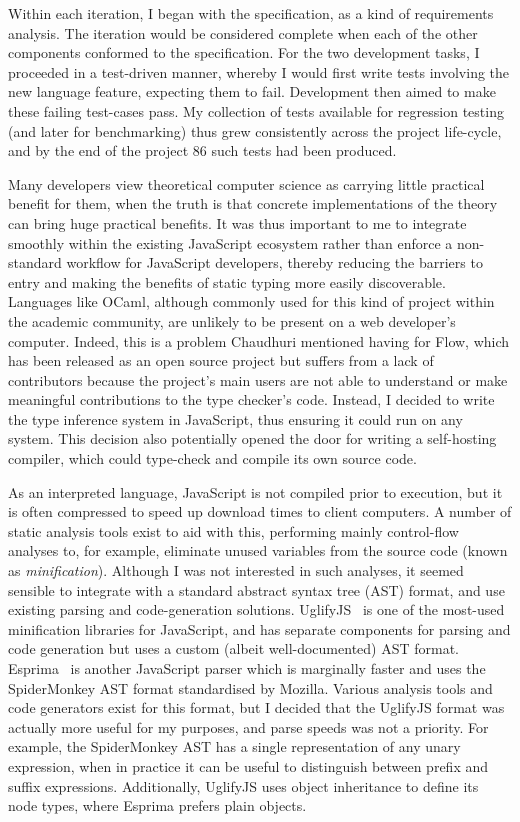 \documentclass[12pt,a4paper,twoside,openright]{report}
\begin{document}
Within each iteration, I began with the specification, as a kind of
requirements analysis. The iteration would be considered complete when each of
the other components conformed to the specification. For the two development
tasks, I proceeded in a test-driven manner, whereby I would first write tests
involving the new language feature, expecting them to fail. Development 
then aimed to make these failing test-cases pass. My collection of tests
available for regression testing (and later for benchmarking) thus grew
consistently across the project life-cycle, and by the end of the project 86
such tests had been produced.

Many developers view theoretical computer science as carrying little practical
benefit for them, when the truth is that concrete implementations of the theory
can bring huge practical benefits. It was thus important to me to integrate
smoothly within the existing JavaScript ecosystem rather than enforce a
non-standard workflow for JavaScript developers, thereby reducing the barriers
to entry and making the benefits of static typing more easily discoverable.
Languages like OCaml, although commonly used for this kind of project within
the academic community, are unlikely to be present on a web developer's
computer. Indeed, this is a problem Chaudhuri mentioned having for Flow, which
has been released as an open source project but suffers from a lack of
contributors because the project's main users are not able to understand or
make meaningful contributions to the type checker's code. Instead, I decided to
write the type inference system in JavaScript, thus ensuring it could run on
any system. This decision also potentially opened the door for writing a
self-hosting compiler, which could type-check and compile its own source code.

As an interpreted language, JavaScript is not compiled prior to execution, but
it is often compressed to speed up download times to client computers. A number
of static analysis tools exist to aid with this, performing mainly control-flow
analyses to, for example, eliminate unused variables from the source code
(known as \textit{minification}). Although I was not interested in such
analyses, it seemed sensible to integrate with a standard abstract syntax tree
(AST) format, and use existing parsing and code-generation solutions.
UglifyJS~\cite{uglify} is one of the most-used minification libraries for
JavaScript, and has separate components for parsing and code generation but
uses a custom (albeit well-documented) AST format. Esprima~\cite{esprima} is
another JavaScript parser which is marginally faster and uses the SpiderMonkey
AST format standardised by Mozilla. Various analysis tools and code generators
exist for this format, but I decided that the UglifyJS format was actually more
useful for my purposes, and parse speeds was not a priority. For example, the
SpiderMonkey AST has a single representation of any unary expression, when in
practice it can be useful to distinguish between prefix and suffix expressions.
Additionally, UglifyJS uses object inheritance to define its node types, where
Esprima prefers plain objects. 
\end{document}
